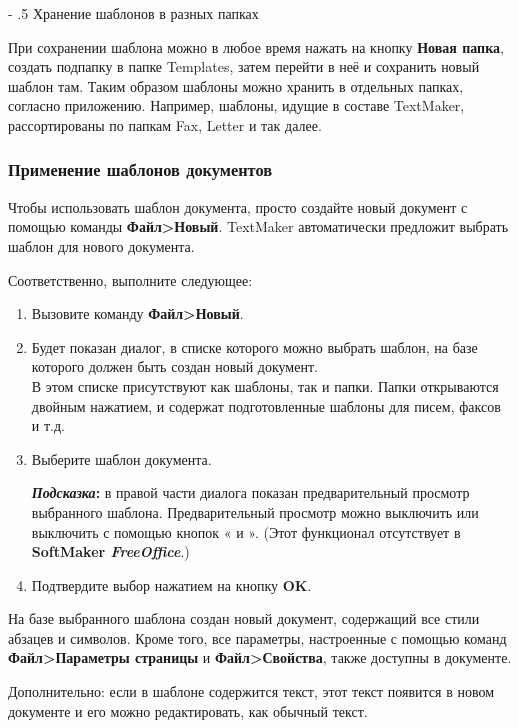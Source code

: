 ﻿\documentclass[a4paper,10pt]{article}
\makeatletter
\renewcommand\paragraph{%
   \@startsection{paragraph}{4}{0mm}%
      {-\baselineskip}%
      {.5\baselineskip}%
      {\normalfont\normalsize\bfseries}}
\makeatother
\begin{document}
\paragraph{Хранение шаблонов в разных папках}

При сохранении шаблона можно в любое время нажать на кнопку \textbf{Новая папка}, создать подпапку в папке Templates, затем перейти в неё и сохранить новый шаблон там. Таким образом шаблоны можно хранить в отдельных папках, согласно приложению. Например, шаблоны, идущие в составе TextMaker, рассортированы по папкам Fax, Letter и так далее.

\subsubsection{Применение шаблонов документов}
Чтобы использовать шаблон документа, просто создайте новый документ с помощью команды \textbf{Файл>Новый}. TextMaker автоматически предложит выбрать шаблон для нового документа.

Соответственно, выполните следующее:
\begin{enumerate}
 \item Вызовите команду \textbf{Файл>Новый}.
 \item Будет показан диалог, в списке которого можно выбрать шаблон, на базе которого должен быть создан новый документ.\\
 В этом списке присутствуют как шаблоны, так и папки. Папки открываются двойным нажатием, и содержат подготовленные шаблоны для писем, факсов и т.д.
 \item Выберите шаблон документа.
 \begin{mdframed}[backgroundcolor=blue!10]
\textbf{\textit{Подсказка}:} в правой части диалога показан предварительный просмотр выбранного шаблона. Предварительный просмотр можно выключить или выключить с помощью кнопок « и ». (Этот функционал отсутствует в \textbf{SoftMaker \textit{FreeOffice}}.)
\end{mdframed}
\item Подтвердите выбор нажатием на кнопку \textbf{OK}.
\end{enumerate}

На базе выбранного шаблона создан новый документ, содержащий все стили абзацев и символов. Кроме того, все параметры, настроенные с помощью команд \textbf{Файл>Параметры страницы} и \textbf{Файл>Свойства}, также доступны в документе.

Дополнительно: если в шаблоне содержится текст, этот текст появится в новом документе и его можно редактировать, как обычный текст.
\end{document}
